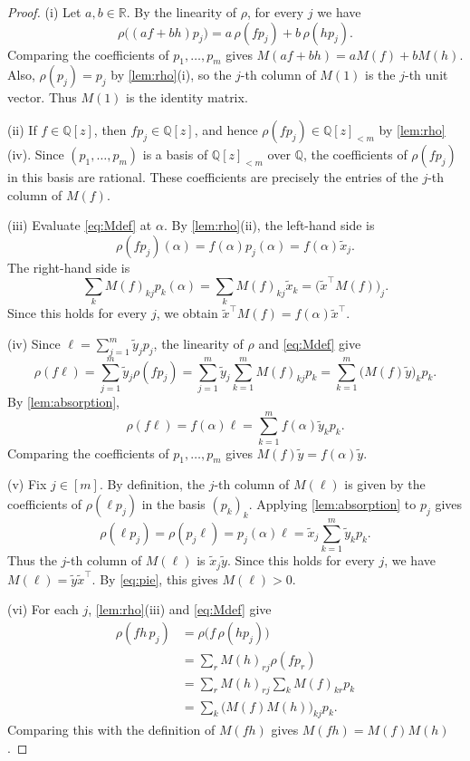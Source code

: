 \documentclass[11pt, a4paper]{article}
\theoremstyle{plain}
\theoremstyle{definition}
\newcommand{\Q}{\mathbb{Q}}
\newcommand{\R}{\mathbb{R}}
\newcommand{\PQ}{\Q[z]_{<m}}
\begin{document}
\begin{proof}
(i) Let $a,b\in\R$. By the linearity of $\rho$, for every $j$ we have
\[
\rho\bigl((af+bh)p_j\bigr)=a\,\rho(fp_j)+b\,\rho(hp_j).
\]
Comparing the coefficients of $p_1,\dots,p_m$ gives
$M(af+bh)=aM(f)+bM(h)$. Also, $\rho(p_j)=p_j$ by \cref{lem:rho}(i), so the $j$-th column of $M(1)$ is the $j$-th unit vector. Thus $M(1)$ is the identity matrix.

(ii) If $f\in\Q[z]$, then $fp_j\in\Q[z]$, and hence $\rho(fp_j)\in\PQ$ by \cref{lem:rho}(iv). Since $(p_1,\dots,p_m)$ is a basis of $\PQ$ over $\Q$, the coefficients of $\rho(fp_j)$ in this basis are rational. These coefficients are precisely the entries of the $j$-th column of $M(f)$.

(iii) Evaluate \cref{eq:Mdef} at $\alpha$. By \cref{lem:rho}(ii), the left-hand side is
\[
\rho(fp_j)(\alpha)=f(\alpha)p_j(\alpha)=f(\alpha)\tilde x_j .
\]
The right-hand side is
\[
\sum_kM(f)_{kj}p_k(\alpha)=\sum_kM(f)_{kj}\tilde x_k
=\bigl(\tilde x^{\top}M(f)\bigr)_j .
\]
Since this holds for every $j$, we obtain $\tilde x^{\top}M(f)=f(\alpha)\tilde x^{\top}$.

(iv) Since $\ell=\sum_{j=1}^m\tilde y_jp_j$, the linearity of $\rho$ and \cref{eq:Mdef} give
\[
\rho(f\ell)
=\sum_{j=1}^m\tilde y_j\rho(fp_j)
=\sum_{j=1}^m\tilde y_j\sum_{k=1}^mM(f)_{kj}p_k
=\sum_{k=1}^m\bigl(M(f)\tilde y\bigr)_kp_k .
\]
By \cref{lem:absorption},
\[
\rho(f\ell)=f(\alpha)\ell=\sum_{k=1}^mf(\alpha)\tilde y_kp_k .
\]
Comparing the coefficients of $p_1,\dots,p_m$ gives $M(f)\tilde y=f(\alpha)\tilde y$.

(v) Fix $j\in[m]$. By definition, the $j$-th column of $M(\ell)$ is given by the coefficients of $\rho(\ell p_j)$ in the basis $(p_k)_k$. Applying \cref{lem:absorption} to $p_j$ gives
\[
\rho(\ell p_j)=\rho(p_j\ell)=p_j(\alpha)\ell
=\tilde x_j\sum_{k=1}^m\tilde y_kp_k .
\]
Thus the $j$-th column of $M(\ell)$ is $\tilde x_j\tilde y$. Since this holds for every $j$, we have $M(\ell)=\tilde y\tilde x^{\top}$. By \cref{eq:pie}, this gives $M(\ell)>0$.

(vi) For each $j$, \cref{lem:rho}(iii) and \cref{eq:Mdef} give
\begin{align*}
\rho(fh\,p_j)
&=\rho\bigl(f\,\rho(hp_j)\bigr)\\
&=\sum_r M(h)_{rj}\rho(fp_r)\\
&=\sum_r M(h)_{rj}\sum_kM(f)_{kr}p_k\\
&=\sum_k\bigl(M(f)M(h)\bigr)_{kj}p_k .
\end{align*}
Comparing this with the definition of $M(fh)$ gives $M(fh)=M(f)M(h)$.
\end{proof}
\end{document}

